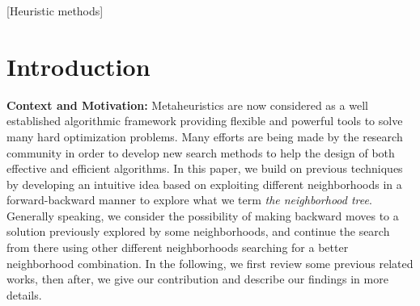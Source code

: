 \documentclass{acm_proc_article-sp}
\begin{document}
[Heuristic methods] 





\section{Introduction}
\label{sec:intro}

\textbf{Context and Motivation:} 
Metaheuristics are now considered as a well established algorithmic framework providing flexible and powerful tools to solve many hard optimization problems. Many efforts are being made by the research community in order to develop new search methods to help the design of both effective and efficient algorithms. 
In this paper, we build on previous techniques by developing an intuitive idea based on exploiting different neighborhoods in a forward-backward manner to explore what we term \emph{the neighborhood tree}. Generally speaking, we consider the possibility of making backward moves to a solution previously explored by some neighborhoods, and continue the search from there using other different neighborhoods searching for a better neighborhood combination. In the following, we first review some previous related works, then after, we give our contribution and describe our findings in more details.
\end{document}
